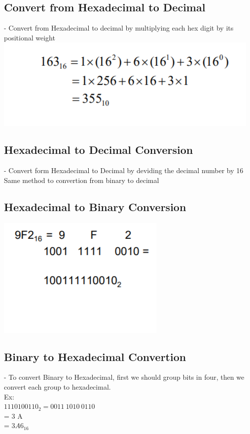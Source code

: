 \documentclass[12pt]{article}
\begin{document}
\subsection*{Convert from Hexadecimal to Decimal}
- Convert from Hexadecimal to decimal by multiplying each hex digit by its positional weight\\
\includegraphics{hinh3}
\subsection*{Hexadecimal to Decimal Conversion}
- Convert form Hexadecimal to Decimal by deviding the decimal number by 16\\
Same method to convertion from binary to decimal\\
\subsection*{Hexadecimal to Binary Conversion}
\includegraphics{hinh4}
\subsection*{Binary to Hexadecimal Convertion}
- To convert Binary to Hexadecimal, first we should group bits in four, then we convert each group to hexadecimal.\\
Ex:\\
$1110100110_2 = 0011 \: 1010 \: 0110$ \\
 = 3 \: A  \\
 = $3A6_{16}$
\end{document}
